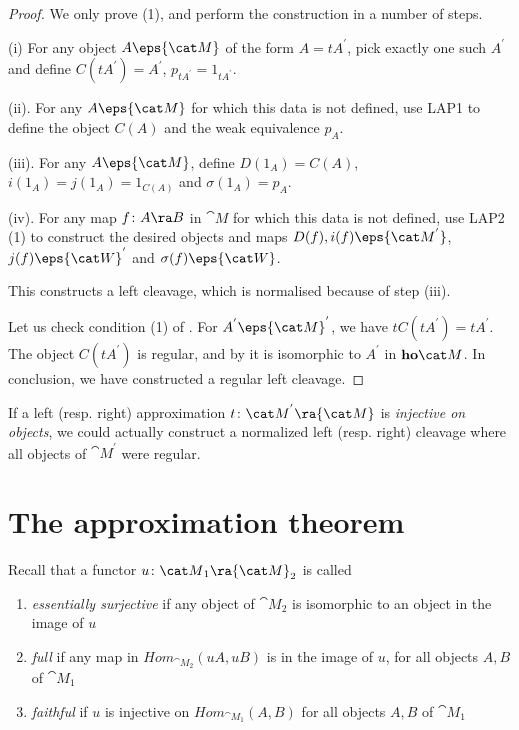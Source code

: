 \begin{proof}
We only prove (1), and perform the construction in a number of steps.

(i) For any object $A \eps {\cat M}$ of the form $A = tA^{'}$, pick exactly one such $A^{'}$ and define $C(tA^{'}) = A^{'}$, $p_{tA^{'}} = 1_{tA^{'}}$.

(ii). For any $A \eps {\cat M}$ for which this data is not defined, use LAP1 to define the object $C(A)$ and the weak equivalence $p_A$.

(iii). For any $A \eps {\cat M}$, define $D(1_A) = C(A)$, $i(1_A) = j(1_A) = 1_{C(A)}$ and $\sigma(1_A) = p_A$.

(iv). For any map $f \colon A \ra B$ in ${\cat M}$ for which this data is not defined, use LAP2 (1) to construct the desired objects and maps $D(f), i(f) \eps {\cat M^{'}}$, $j(f) \eps {\cat W}^{'}$ and $\sigma(f) \eps {\cat W}$.

This constructs a left cleavage, which is normalised because of step (iii). 

Let us check condition (1) of . For $A^{'} \eps {\cat M}^{'}$, we have $tC(tA^{'}) = tA^{'}$. The object $C(tA^{'})$ is regular, and by  it is isomorphic to $A^{'}$ in ${\bf ho}{\cat M}$. In conclusion, we have constructed a regular left cleavage.
\end{proof}

If a left (resp. right) approximation $t \colon {\cat M}^{'} \ra {\cat M}$ is {\it injective on objects}, we could actually construct a normalized left (resp. right) cleavage where all objects of ${\cat M}^{'}$ were regular. 

\section{The approximation theorem}

Recall that a functor $u \colon {\cat M}_1 \ra {\cat M}_2$ is called
\begin{enumerate}
\item
{\it essentially surjective} if any object of ${\cat M}_2$ is isomorphic to an object in the image of $u$
\item
{\it full} if any map in $Hom_{{\cat M}_2}(uA, uB)$ is in the image of $u$, for all objects $A, B$ of ${\cat M}_1$
\item
{\it faithful} if $u$ is injective on $Hom_{{\cat M}_1}(A, B)$ for all objects $A, B$ of ${\cat M}_1$
\end{enumerate}

